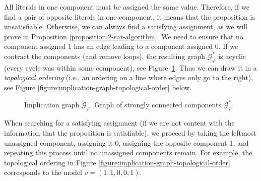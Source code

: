 All literals in one component must be assigned the same value. Therefore, if we find a pair of opposite literals in one component, it means that the proposition is unsatisfiable. Otherwise, we can always find a satisfying assignment, as we will prove in Proposition \ref{proposition:2-sat-algorithm}. We need to ensure that no component assigned 1 has an edge leading to a component assigned 0. If we contract the components (and remove loops), the resulting graph $\mathcal{G}_\varphi^\ast$ is acyclic (every cycle was within some component), see Figure~\ref{figure:implication-graph-components}. Thus we can draw it in a \emph{topological ordering} (i.e., an ordering on a line where edges only go to the right), see Figure \ref{figure:implication-graph-topological-order} below.

\begin{figure} 
    \small   
    \centering
        \caption{Implication graph $\mathcal{G}_\varphi$. Graph of strongly connected components $\mathcal{G}_\varphi^\ast$.}\label{figure:implication-graph-components}
\end{figure}

When searching for a satisfying assignment (if we are not content with the information that the proposition is satisfiable), we proceed by taking the leftmost unassigned component, assigning it 0, assigning the opposite component 1, and repeating this process until no unassigned components remain. For example, the topological ordering in Figure \ref{figure:implication-graph-topological-order} corresponds to the model $v = (1,1,0,0,1)$.

